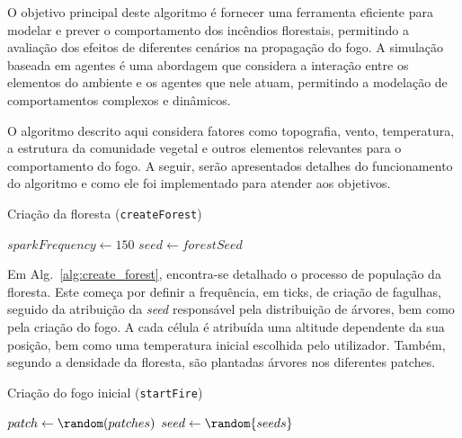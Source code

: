 O objetivo principal deste algoritmo é fornecer uma ferramenta eficiente para modelar e prever o comportamento dos incêndios florestais, permitindo a avaliação dos efeitos de diferentes cenários na propagação do fogo.
A simulação baseada em agentes é uma abordagem que considera a interação entre os elementos do ambiente e os agentes que nele atuam, permitindo a modelação de comportamentos complexos e dinâmicos.

O algoritmo descrito aqui considera fatores como topografia, vento, temperatura, a estrutura da comunidade vegetal e outros elementos relevantes para o comportamento do fogo.
A seguir, serão apresentados detalhes do funcionamento do algoritmo e como ele foi implementado para atender aos objetivos.


\begin{algorithm}
    \caption{Criação da floresta (\texttt{createForest})}\label{alg:create_forest}
    $sparkFrequency \gets 150$\;
    $seed \gets forestSeed$\;
\end{algorithm}

Em Alg.~\ref{alg:create_forest}, encontra-se detalhado o processo de população da floresta.
Este começa por definir a frequência, em ticks, de criação de fagulhas, seguido da atribuição da \textit{seed} responsável pela distribuição de árvores, bem como pela criação do fogo.
A cada célula é atribuída uma altitude dependente da sua posição, bem como uma temperatura inicial escolhida pelo utilizador.
Também, segundo a densidade da floresta, são plantadas árvores nos diferentes patches.


\begin{algorithm}
    \caption{Criação do fogo inicial (\texttt{startFire})}\label{alg:start_fire}
    $patch \gets \random(patches)$\;
    \;
    \saveConfig{}\;
    $seed \gets \random{seeds}$\;
    \While{\anyTreesBurning{}}{
        \saveIteration{}\;
        \fire{}\;
    }
    \saveIterations{}\;
\end{algorithm}

